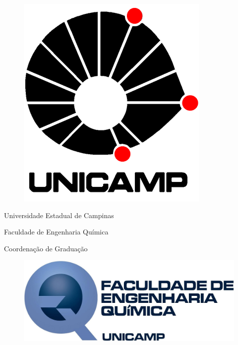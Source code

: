 
\begin{titlepage}
\begin{center}

\begin{minipage}{0.2\linewidth}
    \begin{flushleft}
        \begin{figure}[H]
    		\includegraphics[scale=0.21]{Imagens/LOGO-UNICAMP.png}
    	\end{figure}
    \end{flushleft}
\end{minipage}
\begin{minipage}{0.5\linewidth}
	\begin{center}
		
		Universidade Estadual de Campinas
		
		Faculdade de Engenharia Química
		
		Coordenação de Graduação
		
	\end{center}
\end{minipage}
\begin{minipage}{0.25\linewidth}
    \begin{flushleft}
        \begin{figure}[H]
    		\includegraphics[scale=0.3]{Imagens/LOGO-EQ.jpg}
    	\end{figure}
    \end{flushleft}
\end{minipage}


\end{center}
\end{titlepage}
